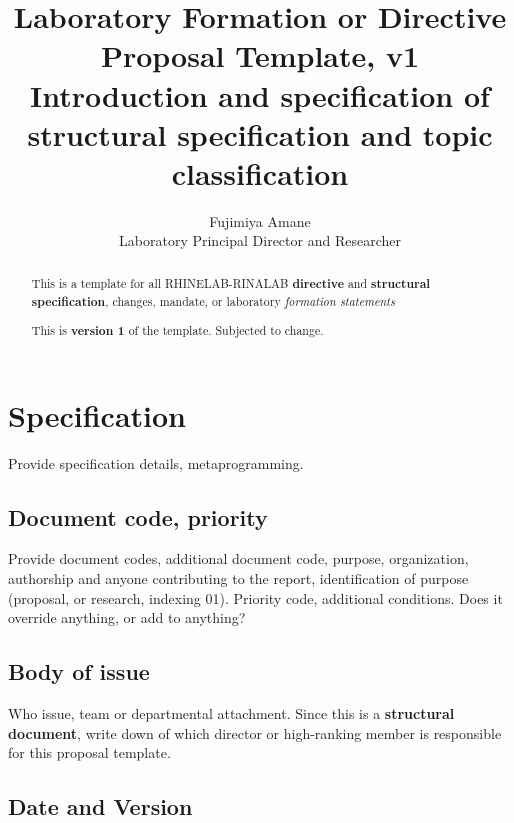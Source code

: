 \documentclass[10pt,a4paper]{article}
\title{\textbf{Laboratory Formation or Directive Proposal Template}, v1  \\ {\small Introduction and specification of \textbf{structural specification and topic classification}}} %
\author{Fujimiya Amane \\ {\small Laboratory Principal Director and Researcher}} %
\affiliation{} %
\begin{document}
\maketitle

\begin{abstract}
    \noindent
    This is a template for all RHINELAB-RINALAB \textbf{directive} and \textbf{structural specification}, changes, mandate, or laboratory \textit{formation statements}
    
    This is \textbf{version 1} of the template. Subjected to change. 

\end{abstract}

\vspace{2.5cm}



\thispagestyle{firstpage}

\pagebreak


\newgeometry{} %

\section{Specification}
\label{sec:spec}

Provide specification details, metaprogramming. 

\subsection{Document code, priority}

Provide document codes, additional document code, purpose, organization, authorship and anyone contributing to the report, identification of purpose (proposal, or research, indexing 01). Priority code, additional conditions. Does it override anything, or add to anything?

\subsection{Body of issue}

Who issue, team or departmental attachment. Since this is a \textbf{structural document}, write down of which director or high-ranking member is responsible for this proposal template.  

\subsection{Date and Version}
\end{document}
